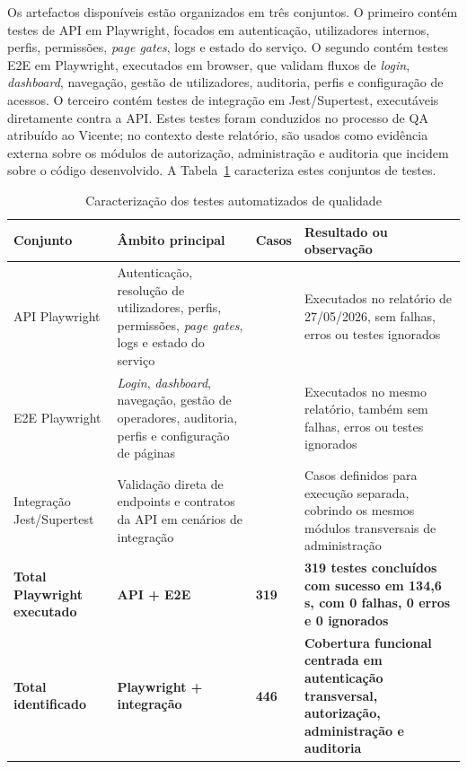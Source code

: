 Os artefactos disponíveis estão organizados em três conjuntos. O primeiro contém testes de \gls{API} em Playwright, focados em autenticação, utilizadores internos, perfis, permissões, \textit{page gates}, logs e estado do serviço. O segundo contém testes \gls{E2E} em Playwright, executados em browser, que validam fluxos de \textit{login}, \textit{dashboard}, navegação, gestão de utilizadores, auditoria, perfis e configuração de acessos. O terceiro contém testes de integração em Jest/Supertest, executáveis diretamente contra a \gls{API}. Estes testes foram conduzidos no processo de \gls{QA} atribuído ao Vicente; no contexto deste relatório, são usados como evidência externa sobre os módulos de autorização, administração e auditoria que incidem sobre o código desenvolvido. A Tabela~\ref{tab:testes_qa} caracteriza estes conjuntos de testes.

\begin{table}[H]
\caption{Caracterização dos testes automatizados de qualidade}
\label{tab:testes_qa}
\begin{center}
\begingroup
\scriptsize
\setlength{\tabcolsep}{4pt}
\begin{tabular}{|>{\raggedright\arraybackslash}p{2.5cm}|>{\raggedright\arraybackslash}p{4.2cm}|>{\raggedright\arraybackslash}p{1.5cm}|>{\raggedright\arraybackslash}p{4.5cm}|}
\hline
\textbf{Conjunto} & \textbf{Âmbito principal} & \textbf{Casos} & \textbf{Resultado ou observação} \\ \hline
\gls{API} Playwright & Autenticação, resolução de utilizadores, perfis, permissões, \textit{page gates}, logs e estado do serviço & 223 & Executados no relatório de 27/05/2026, sem falhas, erros ou testes ignorados \\ \hline
\gls{E2E} Playwright & \textit{Login}, \textit{dashboard}, navegação, gestão de operadores, auditoria, perfis e configuração de páginas & 96 & Executados no mesmo relatório, também sem falhas, erros ou testes ignorados \\ \hline
Integração Jest/Supertest & Validação direta de endpoints e contratos da \gls{API} em cenários de integração & 127 & Casos definidos para execução separada, cobrindo os mesmos módulos transversais de administração \\ \hline
\textbf{Total Playwright executado} & \textbf{API + E2E} & \textbf{319} & \textbf{319 testes concluídos com sucesso em 134,6 s, com 0 falhas, 0 erros e 0 ignorados} \\ \hline
\textbf{Total identificado} & \textbf{Playwright + integração} & \textbf{446} & \textbf{Cobertura funcional centrada em autenticação transversal, autorização, administração e auditoria} \\ \hline
\end{tabular}
\endgroup
\end{center}
\end{table}

